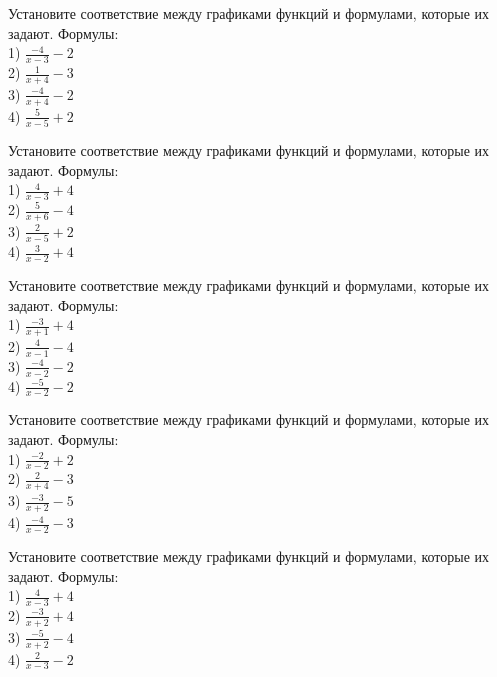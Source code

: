 \documentclass[4apaper]{article}
\begin{document}
\begin{taskBN}{16}
Установите соответствие между графиками функций и формулами, которые их задают. Формулы: \\1) $\frac{-4}{x-3}-2$\\2) $\frac{1}{x+4}-3$\\3) $\frac{-4}{x+4}-2$\\4) $\frac{5}{x-5}+2$
\end{taskBN}

\begin{taskBN}{17}
Установите соответствие между графиками функций и формулами, которые их задают. Формулы: \\1) $\frac{4}{x-3}+4$\\2) $\frac{5}{x+6}-4$\\3) $\frac{2}{x-5}+2$\\4) $\frac{3}{x-2}+4$
\end{taskBN}

\begin{taskBN}{18}
Установите соответствие между графиками функций и формулами, которые их задают. Формулы: \\1) $\frac{-3}{x+1}+4$\\2) $\frac{4}{x-1}-4$\\3) $\frac{-4}{x-2}-2$\\4) $\frac{-5}{x-2}-2$
\end{taskBN}

\begin{taskBN}{19}
Установите соответствие между графиками функций и формулами, которые их задают. Формулы: \\1) $\frac{-2}{x-2}+2$\\2) $\frac{2}{x+4}-3$\\3) $\frac{-3}{x+2}-5$\\4) $\frac{-4}{x-2}-3$
\end{taskBN}

\begin{taskBN}{20}
Установите соответствие между графиками функций и формулами, которые их задают. Формулы: \\1) $\frac{4}{x-3}+4$\\2) $\frac{-3}{x+2}+4$\\3) $\frac{-5}{x+2}-4$\\4) $\frac{2}{x-3}-2$
\end{taskBN}
\end{document}
